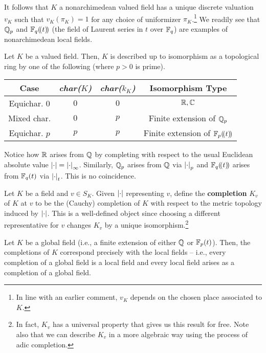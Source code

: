 \documentclass[11pt]{article}
\begin{document}
It follows that $K$ a nonarchimedean valued field has a unique discrete valuation $v_K$ such that $v_K(\pi_K)=1$ for any choice of uniformizer $\pi_K$.\footnote{In line with an earlier comment, $v_K$ depends on the chosen place associated to $K$.} We readily see that $\mathbb{Q}_p$ and $\mathbb{F}_q\!\left(\mkern-3mu\left(t\right)\mkern-3mu\right)$ (the field of Laurent series in $t$ over $\mathbb{F}_q$) are examples of nonarchimedean local fields.

\begin{theorem}
Let $K$ be a valued field. Then, $K$ is described up to isomorphism as a topological ring by one of the following (where $p>0$ is prime).
\begin{center}
\begin{tabular}{||c c c c||}
\hline
Case & \emph{char(}$K$\emph{)} & \emph{char(}$k_K$\emph{)} & Isomorphism Type \\
\hline
Equichar. $0$ & $0$ & $0$ & $\mathbb{R},\mathbb{C}$ \\
Mixed char. & $0$ & $p$ & Finite extension of $\mathbb{Q}_p$ \\
Equichar. $p$ & $p$ & $p$ & Finite extension of $\mathbb{F}_p\!\left(\mkern-3mu\left(t\right)\mkern-3mu\right)$ \\
\hline
\end{tabular}
\end{center}
\end{theorem}

Notice how $\mathbb{R}$ arises from $\mathbb{Q}$ by completing with respect to the usual Euclidean absolute value $\left\lvert\cdot\right\rvert=\left\lvert\cdot\right\rvert_{\infty}$. Similarly, $\mathbb{Q}_p$ arises from $\mathbb{Q}$ via $\left\lvert\cdot\right\rvert_p$ and $\mathbb{F}_q\!\left(\mkern-3mu\left(t\right)\mkern-3mu\right)$ arises from $\mathbb{F}_q(t)$ via $\left\lvert\cdot\right\rvert_t$. This is no coincidence.

\begin{definition}
Let $K$ be a field and $v\in S_K$. Given $\left\lvert\cdot\right\rvert$ representing $v$, define the \textbf{completion} $K_v$ of $K$ at $v$ to be the (Cauchy) completion of $K$ with respect to the metric topology induced by $\left\lvert\cdot\right\rvert$. This is a well-defined object since choosing a different representative for $v$ changes $K_v$ by a unique isomorphism.\footnote{In fact, $K_v$ has a universal property that gives us this result for free. Note also that we can describe $K_v$ in a more algebraic way using the process of adic completion.}
\end{definition}

\begin{corollary}
Let $K$ be a global field (i.e., a finite extension of either $\mathbb{Q}$ or $\mathbb{F}_p(t)$). Then, the completions of $K$ correspond precisely with the local fields -- i.e., every completion of a global field is a local field and every local field arises as a completion of a global field.
\end{corollary}
\end{document}
